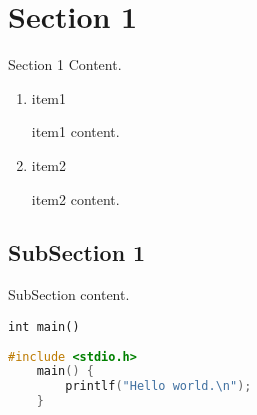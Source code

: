 \section{Section 1}

Section 1 Content.

\begin{enumerate}[itemsep=0pt,parsep=0pt,label=(\arabic*)]
\item item1

item1 content.

\item item2

item2 content.

\end{enumerate}

\subsection{SubSection 1}

SubSection content.


\texttt{int main() {}}

\lstset{ basicstyle=\ttfamily, keywordstyle=\bfseries, commentstyle=\ttfamily, numbers=right, numberstyle=\footnotesize }
\begin{lstlisting}[language=C]
	#include <stdio.h>
	main() {
	    printlf("Hello world.\n");
	}
\end{lstlisting}

\newpage
